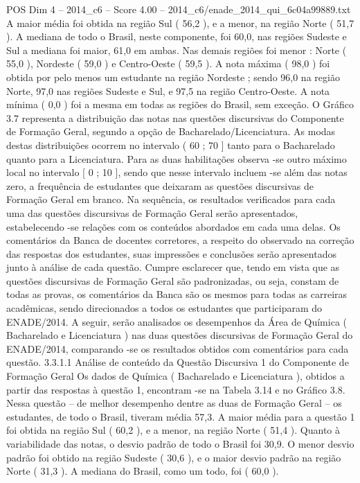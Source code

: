 \begin{textsample}{POS Dim 4 – 2014\_c6 – Score 4.00 – 2014\_c6/enade\_2014\_qui\_6c04a99889.txt}
A maior média foi obtida na região Sul ( 56,2 ), e a menor, na região Norte ( 51,7 ).
A mediana de todo o Brasil, neste componente, foi 60,0, nas regiões Sudeste e Sul a mediana foi maior, 61,0 em ambas.
Nas demais regiões foi menor : Norte ( 55,0 ), Nordeste ( 59,0 ) e Centro-Oeste ( 59,5 ).
A nota máxima ( 98,0 ) foi obtida por pelo menos um estudante na região Nordeste ; sendo 96,0 na região Norte, 97,0 nas regiões Sudeste e Sul, e 97,5 na região Centro-Oeste.
A nota mínima ( 0,0 ) foi a mesma em todas as regiões do Brasil, sem exceção.
O Gráfico 3.7 representa a distribuição das notas nas questões discursivas do Componente de Formação Geral, segundo a opção de Bacharelado/Licenciatura.
As modas destas distribuições ocorrem no intervalo ( 60 ; 70 ] tanto para o Bacharelado quanto para a Licenciatura.
Para as duas habilitações observa -se outro máximo local no intervalo [ 0 ; 10 ], sendo que nesse intervalo incluem -se além das notas zero, a frequência de estudantes que deixaram as questões discursivas de Formação Geral em branco.
Na sequência, os resultados verificados para cada uma das questões discursivas de Formação Geral serão apresentados, estabelecendo -se relações com os conteúdos abordados em cada uma delas.
Os comentários da Banca de docentes corretores, a respeito do observado na correção das respostas dos estudantes, suas impressões e conclusões serão apresentados junto à análise de cada questão.
Cumpre esclarecer que, tendo em vista que as questões discursivas de Formação Geral são padronizadas, ou seja, constam de todas as provas, os comentários da Banca são os mesmos para todas as carreiras acadêmicas, sendo direcionados a todos os estudantes que participaram do ENADE/2014.
A seguir, serão analisados os desempenhos da Área de Química ( Bacharelado e Licenciatura ) nas duas questões discursivas de Formação Geral do ENADE/2014, comparando -se os resultados obtidos com comentários para cada questão. 3.3.1.1 Análise de conteúdo da Questão Discursiva 1 do Componente de Formação Geral Os dados de Química ( Bacharelado e Licenciatura ), obtidos a partir das respostas à questão 1, encontram -se na Tabela 3.14 e no Gráfico 3.8.
Nessa questão – de melhor desempenho dentre as duas de Formação Geral – os estudantes, de todo o Brasil, tiveram média 57,3.
A maior média para a questão 1 foi obtida na região Sul ( 60,2 ), e a menor, na região Norte ( 51,4 ).
Quanto à variabilidade das notas, o desvio padrão de todo o Brasil foi 30,9.
O menor desvio padrão foi obtido na região Sudeste ( 30,6 ), e o maior desvio padrão na região Norte ( 31,3 ).
A mediana do Brasil, como um todo, foi ( 60,0 ).

\end{textsample}
